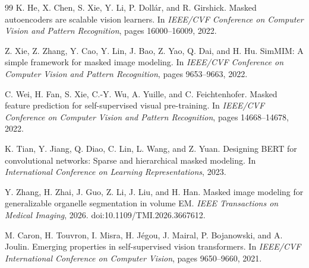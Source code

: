 \documentclass[11pt]{article}
\begin{document}
\begin{thebibliography}{99}
K. He, X. Chen, S. Xie, Y. Li, P. Doll{\'a}r, and R. Girshick.
\newblock Masked autoencoders are scalable vision learners.
\newblock In \emph{IEEE/CVF Conference on Computer Vision and Pattern Recognition}, pages 16000--16009, 2022.

Z. Xie, Z. Zhang, Y. Cao, Y. Lin, J. Bao, Z. Yao, Q. Dai, and H. Hu.
\newblock SimMIM: A simple framework for masked image modeling.
\newblock In \emph{IEEE/CVF Conference on Computer Vision and Pattern Recognition}, pages 9653--9663, 2022.

C. Wei, H. Fan, S. Xie, C.-Y. Wu, A. Yuille, and C. Feichtenhofer.
\newblock Masked feature prediction for self-supervised visual pre-training.
\newblock In \emph{IEEE/CVF Conference on Computer Vision and Pattern Recognition}, pages 14668--14678, 2022.

K. Tian, Y. Jiang, Q. Diao, C. Lin, L. Wang, and Z. Yuan.
\newblock Designing BERT for convolutional networks: Sparse and hierarchical masked modeling.
\newblock In \emph{International Conference on Learning Representations}, 2023.

Y. Zhang, H. Zhai, J. Guo, Z. Li, J. Liu, and H. Han.
\newblock Masked image modeling for generalizable organelle segmentation in volume EM.
\newblock \emph{IEEE Transactions on Medical Imaging}, 2026.
\newblock doi:10.1109/TMI.2026.3667612.

M. Caron, H. Touvron, I. Misra, H. J{\'e}gou, J. Mairal, P. Bojanowski, and A. Joulin.
\newblock Emerging properties in self-supervised vision transformers.
\newblock In \emph{IEEE/CVF International Conference on Computer Vision}, pages 9650--9660, 2021.

\end{thebibliography}
\end{document}
